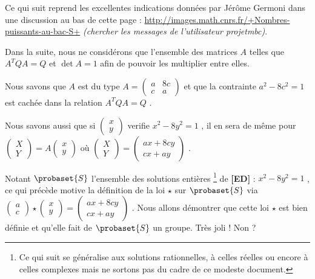 Ce qui suit reprend les excellentes indications données par Jérôme Germoni dans une discussion au bas de cette page :
\url{http://images.math.cnrs.fr/+Nombres-puissants-au-bac-S+}
\textit{(chercher les messages de l'utilisateur projetmbc)}.


\bigskip

Dans la suite, nous ne considérons que l'ensemble des matrices $A$ telles que $A^T Q A = Q$ et $\det A = 1$ afin de pouvoir les multiplier entre elles.


\medskip

Nous savons que $A$ est du type 
$A
=
\begin{pmatrix} 
  a & 8c \\ 
  c & a
\end{pmatrix}$ 
et que la contrainte $a^2 - 8c^2 = 1$ est cachée dans la relation $A^T Q A = Q$ .


\medskip

Nous savons aussi que si
$\begin{pmatrix} 
  x \\ 
  y 
\end{pmatrix}$
verifie $x^2 - 8 y^2 = 1$ , il en sera de même pour
$\begin{pmatrix} 
  X \\ 
  Y 
\end{pmatrix}
=
A
\begin{pmatrix} 
  x \\ 
  y 
\end{pmatrix}$
où
$\begin{pmatrix} 
  X \\ 
  Y 
\end{pmatrix}
=
\begin{pmatrix} 
  a x + 8c y \\ 
  c x + a y
\end{pmatrix}$ .


\medskip

Notant $\probaset{S}$ l'ensemble des solutions entières
\footnote{
	Ce qui suit se généralise aux solutions rationnelles, à celles réelles ou encore à celles complexes mais ne sortons pas du cadre de ce modeste document.
}
de \textbf{[ED]} : $x^2 - 8 y^2 = 1$ , ce qui précède motive la définition de la loi $\star$ sur $\probaset{S}$ via
$\begin{pmatrix} 
  a \\ 
  c 
\end{pmatrix}
\star
\begin{pmatrix} 
  x \\ 
  y 
\end{pmatrix}
=
\begin{pmatrix} 
  a x + 8c y \\ 
  c x + a y
\end{pmatrix}$ .
Nous allons démontrer que cette loi $\star$ est bien définie et qu'elle fait de $\probaset{S}$ un groupe. Très joli ! Non ?


